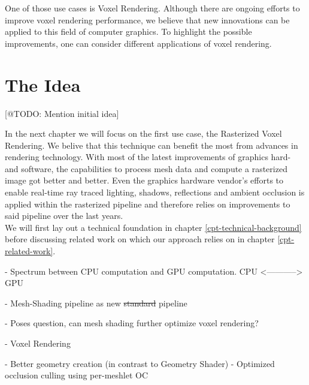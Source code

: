 \noindent
One of those use cases is Voxel Rendering. Although there are ongoing efforts to improve voxel 
rendering performance, we believe that new innovations can be applied to this field of computer 
graphics. To highlight the possible improvements, one can consider different applications of 
voxel rendering. 






\section{The Idea}

[@TODO: Mention initial idea]

\noindent
In the next chapter we will focus on the first use case, the Rasterized Voxel Rendering. We belive that this 
technique can benefit the most from advances in rendering technology.
With most of the latest improvements of graphics hard- and software, the capabilities to process mesh data 
and compute a rasterized image got better and better. Even the graphics hardware vendor's efforts to enable 
real-time ray traced lighting, shadows, reflections and ambient occlusion is applied within the rasterized 
pipeline and therefore relies on improvements to said pipeline over the last years. \\
We will first lay out a technical foundation in chapter \ref{cpt-technical-background} before discussing 
related work on which our approach relies on in chapter \ref{cpt-related-work}.



- Spectrum between CPU computation and GPU computation. 
CPU <-----------> GPU

- Mesh-Shading pipeline as new \st{standard} pipeline

- Poses question, can mesh shading further optimize voxel rendering?

- Voxel Rendering

- Better geometry creation (in contrast to Geometry Shader)
- Optimized occlusion culling using per-meshlet OC
